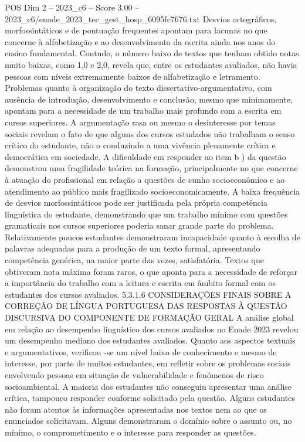 \begin{textsample}{POS Dim 2 – 2023\_c6 – Score 3.00 – 2023\_c6/enade\_2023\_tec\_gest\_hosp\_6095fc7676.txt}
Desvios ortográficos, morfossintáticos e de pontuação frequentes apontam para lacunas no que concerne à alfabetização e ao desenvolvimento da escrita ainda nos anos do ensino fundamental.
Contudo, o número baixo de textos que tenham obtido notas muito baixas, como 1,0 e 2,0, revela que, entre os estudantes avaliados, não havia pessoas com níveis extremamente baixos de alfabetização e letramento.
Problemas quanto à organização do texto dissertativo-argumentativo, com ausência de introdução, desenvolvimento e conclusão, mesmo que minimamente, apontam para a necessidade de um trabalho mais profundo com a escrita em cursos superiores.
A argumentação rasa ou mesmo o desinteresse por temas sociais revelam o fato de que alguns dos cursos estudados não trabalham o senso crítico do estudante, não o conduzindo a uma vivência plenamente crítica e democrática em sociedade.
A dificuldade em responder ao item b ) da questão demonstrou uma fragilidade teórica na formação, principalmente no que concerne à atuação do profissional em relação a questões de cunho socioeconômico e ao atendimento ao público mais fragilizado socioeconomicamente.
A baixa frequência de desvios morfossintáticos pode ser justificada pela própria competência linguística do estudante, demonstrando que um trabalho mínimo com questões gramaticais nos cursos superiores poderia sanar grande parte do problema.
Relativamente poucos estudantes demonstraram incapacidade quanto à escolha de palavras adequadas para a produção de um texto formal, apresentando competência genérica, na maior parte das vezes, satisfatória.
Textos que obtiveram nota máxima foram raros, o que aponta para a necessidade de reforçar a importância do trabalho com a leitura e escrita em âmbito formal com os estudantes dos cursos avaliados. 5.3.1.6 CONSIDERAÇÕES FINAIS SOBRE A CORREÇÃO DE LÍNGUA PORTUGUESA DAS RESPOSTAS À QUESTÃO DISCURSIVA DO COMPONENTE DE FORMAÇÃO GERAL A análise global em relação ao desempenho linguístico dos cursos avaliados no Enade 2023 revelou um desempenho mediano dos estudantes avaliados.
Quanto aos aspectos textuais e argumentativos, verificou -se um nível baixo de conhecimento e mesmo de interesse, por parte de muitos estudantes, em refletir sobre os problemas sociais envolvendo pessoas em situação de vulnerabilidade e fenômenos de risco socioambiental.
A maioria dos estudantes não conseguiu apresentar uma análise crítica, tampouco responder conforme solicitado pela questão.
Alguns estudantes não foram atentos às informações apresentadas nos textos nem ao que os enunciados solicitavam.
Alguns demonstraram o domínio sobre o assunto ou, no mínimo, o comprometimento e o interesse para responder as questões.

\end{textsample}
